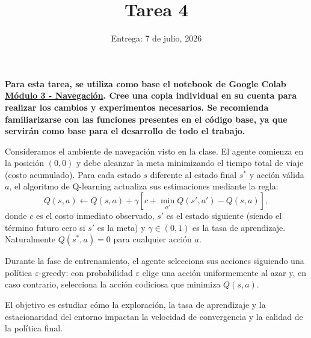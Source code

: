 \documentclass[12pt]{article}
\begin{document}
\title{Tarea 4}
\author{Entrega: 7 de julio, 2026}
\date{}
\maketitle

\textbf{Para esta tarea, se utiliza como base el notebook de Google Colab \href{https://colab.research.google.com/drive/1hJ9RvAWu6cCjrSdI0wOntlIFdFEpmTWu}{Módulo 3 - Navegación}. Cree una copia individual en su cuenta para realizar los cambios y experimentos necesarios. Se recomienda familiarizarse con las funciones presentes en el código base, ya que servirán como base para el desarrollo de todo el trabajo.}

\vspace{0.5cm}

Consideramos el ambiente de navegación visto en la clase. El agente comienza en la posición $(0,0)$ y debe alcanzar la meta minimizando el tiempo total de viaje (costo acumulado). Para cada estado $s$ diferente al estado final $s^*$ y acción válida $a$, el algoritmo de Q-learning actualiza sus estimaciones mediante la regla:
$$
  Q(s,a) \leftarrow Q(s,a) + \gamma \left[c + \min_{a'} Q(s',a') - Q(s,a)\right],
$$
donde $c$ es el costo inmediato observado, $s'$ es el estado siguiente (siendo el término futuro cero si $s'$ es la meta) y $\gamma \in (0,1)$ es la tasa de aprendizaje. Naturalmente $Q(s^*,a) = 0$ para cualquier acción $a$. 

Durante la fase de entrenamiento, el agente selecciona sus acciones siguiendo una política $\varepsilon$-greedy: con probabilidad $\varepsilon$ elige una acción uniformemente al azar y, en caso contrario, selecciona la acción codiciosa que minimiza $Q(s,a)$. 

El objetivo es estudiar cómo la exploración, la tasa de aprendizaje y la estacionaridad del entorno impactan la velocidad de convergencia y la calidad de la política final.
\end{document}
